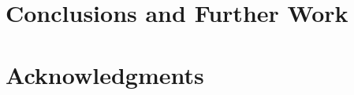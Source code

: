 \documentclass{llncs}
\begin{document}
\section{Conclusions and Further Work}


\section*{Acknowledgments}





\end{document}
